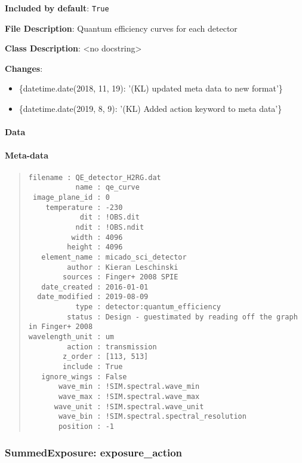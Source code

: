 \textbf{Included by default}: \texttt{True}

\textbf{File Description}: Quantum efficiency curves for each detector

\textbf{Class Description}: <no docstring>

\textbf{Changes}:

\begin{itemize}
\item \{datetime.date(2018, 11, 19): '(KL) updated meta data to new format'\}

\item \{datetime.date(2019, 8, 9): '(KL) Added action keyword to meta data'\}
\end{itemize}


\paragraph{Data%
  \label{id1}%
}


\paragraph{Meta-data%
  \label{id2}%
}

\begin{quote}
\begin{alltt}
\begin{lstlisting}[frame=single]
       filename : QE_detector_H2RG.dat
           name : qe_curve
 image_plane_id : 0
    temperature : -230
            dit : !OBS.dit
           ndit : !OBS.ndit
          width : 4096
         height : 4096
   element_name : micado_sci_detector
         author : Kieran Leschinski
        sources : Finger+ 2008 SPIE
   date_created : 2016-01-01
  date_modified : 2019-08-09
           type : detector:quantum_efficiency
         status : Design - guestimated by reading off the graph in Finger+ 2008
wavelength_unit : um
         action : transmission
        z_order : [113, 513]
        include : True
   ignore_wings : False
       wave_min : !SIM.spectral.wave_min
       wave_max : !SIM.spectral.wave_max
      wave_unit : !SIM.spectral.wave_unit
       wave_bin : !SIM.spectral.spectral_resolution
       position : -1
\end{lstlisting}
\end{alltt}
\end{quote}


\subsubsection{SummedExposure: \textquotedbl{}exposure\_action\textquotedbl{}%
  \label{summedexposure-exposure-action}%
}

